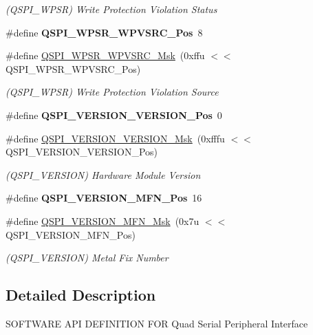 \begin{DoxyCompactItemize}
\begin{DoxyCompactList}\small\item\em (Q\+S\+P\+I\+\_\+\+W\+P\+SR) Write Protection Violation Status \end{DoxyCompactList}\item 
\mbox{\label{group__SAMV71__QSPI_ga3b09542f57db4ff8079f2eb7502fd8ae}} 
\#define {\bfseries Q\+S\+P\+I\+\_\+\+W\+P\+S\+R\+\_\+\+W\+P\+V\+S\+R\+C\+\_\+\+Pos}~8
\item 
\mbox{\label{group__SAMV71__QSPI_gab225658731bd850a2bfa6bd12ecb6cea}} 
\#define \mbox{\hyperlink{group__SAMV71__QSPI_gab225658731bd850a2bfa6bd12ecb6cea}{Q\+S\+P\+I\+\_\+\+W\+P\+S\+R\+\_\+\+W\+P\+V\+S\+R\+C\+\_\+\+Msk}}~(0xffu $<$$<$ Q\+S\+P\+I\+\_\+\+W\+P\+S\+R\+\_\+\+W\+P\+V\+S\+R\+C\+\_\+\+Pos)
\begin{DoxyCompactList}\small\item\em (Q\+S\+P\+I\+\_\+\+W\+P\+SR) Write Protection Violation Source \end{DoxyCompactList}\item 
\mbox{\label{group__SAMV71__QSPI_ga5ef07bf71362fd293e3c24e457031f2f}} 
\#define {\bfseries Q\+S\+P\+I\+\_\+\+V\+E\+R\+S\+I\+O\+N\+\_\+\+V\+E\+R\+S\+I\+O\+N\+\_\+\+Pos}~0
\item 
\mbox{\label{group__SAMV71__QSPI_gabb4e0e07f15f8021feaed71213cba126}} 
\#define \mbox{\hyperlink{group__SAMV71__QSPI_gabb4e0e07f15f8021feaed71213cba126}{Q\+S\+P\+I\+\_\+\+V\+E\+R\+S\+I\+O\+N\+\_\+\+V\+E\+R\+S\+I\+O\+N\+\_\+\+Msk}}~(0xfffu $<$$<$ Q\+S\+P\+I\+\_\+\+V\+E\+R\+S\+I\+O\+N\+\_\+\+V\+E\+R\+S\+I\+O\+N\+\_\+\+Pos)
\begin{DoxyCompactList}\small\item\em (Q\+S\+P\+I\+\_\+\+V\+E\+R\+S\+I\+ON) Hardware Module Version \end{DoxyCompactList}\item 
\mbox{\label{group__SAMV71__QSPI_ga58aa9044d4d7d50e6b754ab033363542}} 
\#define {\bfseries Q\+S\+P\+I\+\_\+\+V\+E\+R\+S\+I\+O\+N\+\_\+\+M\+F\+N\+\_\+\+Pos}~16
\item 
\mbox{\label{group__SAMV71__QSPI_gadb313074082e3e5c368d8e6b8304fefb}} 
\#define \mbox{\hyperlink{group__SAMV71__QSPI_gadb313074082e3e5c368d8e6b8304fefb}{Q\+S\+P\+I\+\_\+\+V\+E\+R\+S\+I\+O\+N\+\_\+\+M\+F\+N\+\_\+\+Msk}}~(0x7u $<$$<$ Q\+S\+P\+I\+\_\+\+V\+E\+R\+S\+I\+O\+N\+\_\+\+M\+F\+N\+\_\+\+Pos)
\begin{DoxyCompactList}\small\item\em (Q\+S\+P\+I\+\_\+\+V\+E\+R\+S\+I\+ON) Metal Fix Number \end{DoxyCompactList}\end{DoxyCompactItemize}


\subsection{Detailed Description}
S\+O\+F\+T\+W\+A\+RE A\+PI D\+E\+F\+I\+N\+I\+T\+I\+ON F\+OR Quad Serial Peripheral Interface 